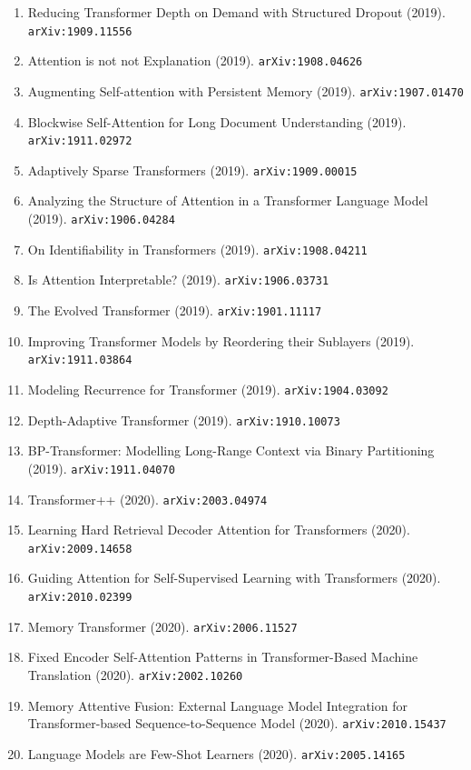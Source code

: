 \documentclass[11pt]{article}
\begin{document}
\begin{enumerate}
  \item Reducing Transformer Depth on Demand with Structured Dropout (2019). \texttt{arXiv:1909.11556}
  \item Attention is not not Explanation (2019). \texttt{arXiv:1908.04626}
  \item Augmenting Self-attention with Persistent Memory (2019). \texttt{arXiv:1907.01470}
  \item Blockwise Self-Attention for Long Document Understanding (2019). \texttt{arXiv:1911.02972}
  \item Adaptively Sparse Transformers (2019). \texttt{arXiv:1909.00015}
  \item Analyzing the Structure of Attention in a Transformer Language Model (2019). \texttt{arXiv:1906.04284}
  \item On Identifiability in Transformers (2019). \texttt{arXiv:1908.04211}
  \item Is Attention Interpretable? (2019). \texttt{arXiv:1906.03731}
  \item The Evolved Transformer (2019). \texttt{arXiv:1901.11117}
  \item Improving Transformer Models by Reordering their Sublayers (2019). \texttt{arXiv:1911.03864}
  \item Modeling Recurrence for Transformer (2019). \texttt{arXiv:1904.03092}
  \item Depth-Adaptive Transformer (2019). \texttt{arXiv:1910.10073}
  \item BP-Transformer: Modelling Long-Range Context via Binary Partitioning (2019). \texttt{arXiv:1911.04070}
  \item Transformer++ (2020). \texttt{arXiv:2003.04974}
  \item Learning Hard Retrieval Decoder Attention for Transformers (2020). \texttt{arXiv:2009.14658}
  \item Guiding Attention for Self-Supervised Learning with Transformers (2020). \texttt{arXiv:2010.02399}
  \item Memory Transformer (2020). \texttt{arXiv:2006.11527}
  \item Fixed Encoder Self-Attention Patterns in Transformer-Based Machine
  Translation (2020). \texttt{arXiv:2002.10260}
  \item Memory Attentive Fusion: External Language Model Integration for
  Transformer-based Sequence-to-Sequence Model (2020). \texttt{arXiv:2010.15437}
  \item Language Models are Few-Shot Learners (2020). \texttt{arXiv:2005.14165}

\end{enumerate}
\end{document}
